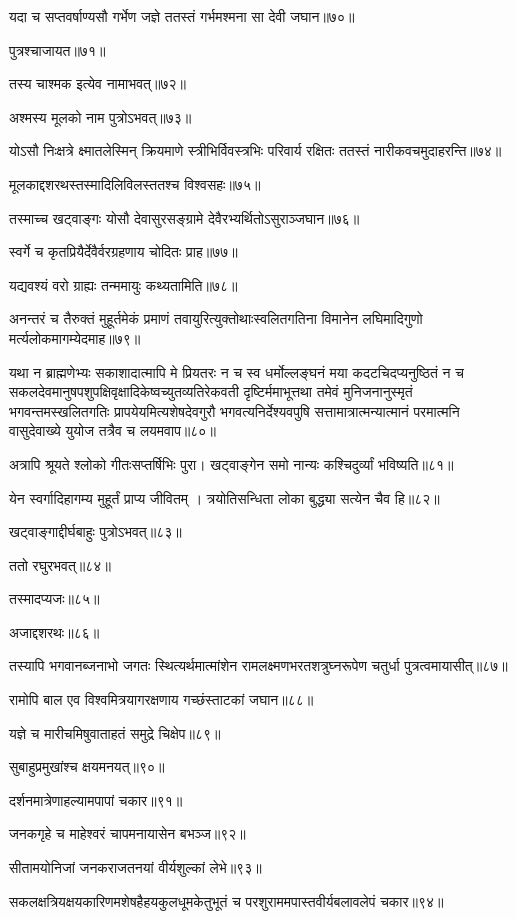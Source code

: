 \begin{flushleft}
यदा च सप्तवर्षाण्यसौ गर्भेण जज्ञे ततस्तं गर्भमश्मना सा देवी जघान॥७०॥

पुत्रश्चाजायत॥७१॥

तस्य चाश्मक इत्येव नामाभवत्॥७२॥

अश्मस्य मूलको नाम पुत्रोऽभवत्॥७३॥

योऽसौ निःक्षत्रे क्ष्मातलेस्मिन् क्रियमाणे स्त्रीभिर्विवस्त्रभिः परिवार्य रक्षितः ततस्तं नारीकवचमुदाहरन्ति॥७४॥

मूलकाद्दशरथस्तस्मादिलिविलस्ततश्च विश्वसहः॥७५॥

तस्माच्च खट्वाङ्गः योसौ देवासुरसङ्ग्रामे देवैरभ्यर्थितोऽसुराञ्जघान॥७६॥

स्वर्गे च कृतप्रियैर्देवैर्वरग्रहणाय चोदितः प्राह॥७७॥

यद्यवश्यं वरो ग्राह्यः तन्ममायुः कथ्यतामिति॥७८॥

अनन्तरं च तैरुक्तं मुहूर्तमेकं प्रमाणं तवायुरित्युक्तोथाःस्वलितगतिना विमानेन लघिमादिगुणो मर्त्यलोकमागम्येदमाह॥७९॥

यथा न ब्राह्मणेभ्यः सकाशादात्मापि मे प्रियतरः न च स्व धर्मोल्लङ्घनं मया कदटचिदप्यनुष्ठितं न च सकलदेवमानुषपशुपक्षिवृक्षादिकेष्वच्युतव्यतिरेकवती दृष्टिर्ममाभूत्तथा तमेवं मुनिजनानुस्मृतं भगवन्तमस्खलितगतिः प्रापयेयमित्यशेषदेवगुरौ भगवत्यनिर्देश्यवपुषि सत्तामात्रात्मन्यात्मानं परमात्मनि वासुदेवाख्ये युयोज तत्रैव च लयमवाप॥८०॥

अत्रापि श्रूयते श्लोको गीतःसप्तर्षिभिः पुरा।
खट्वाङ्गेन समो नान्यः कश्चिदुर्व्यां भविष्यति॥८१॥

येन स्वर्गादिहागम्य मुहूर्तं प्राप्य जीवितम् ।
त्रयोतिसन्धिता लोका बुद्ध्या सत्येन चैव हि॥८२॥

खट्वाङ्गाद्दीर्घबाहुः पुत्रोऽभवत्॥८३॥

ततो रघुरभवत्॥८४॥

तस्मादप्यजः॥८५॥

अजाद्दशरथः॥८६॥

तस्यापि भगवानब्जनाभो जगतः स्थित्यर्थमात्मांशेन रामलक्ष्मणभरतशत्रुघ्नरूपेण चतुर्धा
पुत्रत्वमायासीत्॥८७॥

रामोपि बाल एव विश्वमित्रयागरक्षणाय गच्छंस्ताटकां जघान॥८८॥

यज्ञे च मारीचमिषुवाताहतं समुद्रे चिक्षेप॥८९॥

सुबाहुप्रमुखांश्च क्षयमनयत्॥९०॥

दर्शनमात्रेणाहल्यामपापां चकार॥९१॥

जनकगृहे च माहेश्वरं चापमनायासेन बभञ्ज॥९२॥

सीतामयोनिजां जनकराजतनयां वीर्यशुल्कां लेभे॥९३॥

सकलक्षत्रियक्षयकारिणमशेषहैहयकुलधूमकेतुभूतं च परशुराममपास्तवीर्यबलावलेपं चकार॥९४॥


\end{flushleft}
